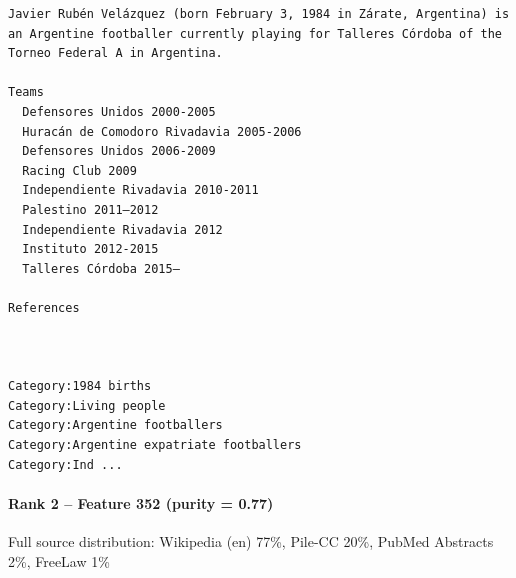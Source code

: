 \begin{verbatim}
Javier Rubén Velázquez (born February 3, 1984 in Zárate, Argentina) is an Argentine footballer currently playing for Talleres Córdoba of the Torneo Federal A in Argentina.

Teams
  Defensores Unidos 2000-2005
  Huracán de Comodoro Rivadavia 2005-2006
  Defensores Unidos 2006-2009
  Racing Club 2009
  Independiente Rivadavia 2010-2011
  Palestino 2011–2012
  Independiente Rivadavia 2012
  Instituto 2012-2015
  Talleres Córdoba 2015–

References
 
 

Category:1984 births
Category:Living people
Category:Argentine footballers
Category:Argentine expatriate footballers
Category:Ind ...

\end{verbatim}

\paragraph*{Rank 2 -- Feature 352 (purity = 0.77)}

Full source distribution: Wikipedia (en) 77\%, Pile-CC 20\%, PubMed Abstracts 2\%, FreeLaw 1\%


